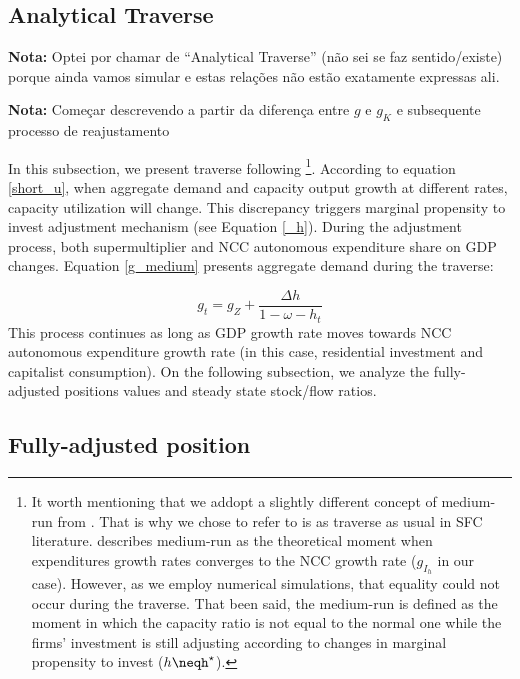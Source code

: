 \documentclass[11pt]{article}
\begin{document}
\subsection{Analytical Traverse}
\label{sec:org9442cc1}

\textbf{Nota:} Optei por chamar de ``Analytical Traverse'' (não sei se faz sentido/existe) porque ainda vamos simular e estas relações não estão exatamente expressas ali.

\textbf{Nota:} Começar descrevendo a partir da diferença entre \(g\) e \(g_K\) e subsequente processo de reajustamento

In this subsection, we present traverse following \textcite{freitas_growth_2015}\footnote{It worth mentioning that we addopt a slightly different concept of medium-run from \textcite{freitas_growth_2015}. That is why we chose to refer to is as traverse as usual in SFC literature. \textcite{freitas_growth_2015} describes medium-run as the theoretical moment when expenditures growth rates converges to the NCC growth rate (\(g_{I_h}\) in our case). However, as we employ numerical simulations, that equality could not occur during the traverse. That been said, the medium-run is defined as the moment in which the capacity ratio is not equal to the normal one while the firms' investment is still adjusting according to changes in marginal propensity to invest (\(h\neqh^\star\)).}.
According to equation \ref{short_u}, when aggregate demand and capacity output growth at different rates, capacity utilization will change. 
This discrepancy triggers marginal propensity to invest adjustment mechanism (see Equation \ref{_h}). 
During the adjustment process, both supermultiplier and NCC autonomous expenditure share on GDP changes.
Equation \ref{g_medium} presents aggregate demand during the traverse:

\begin{equation}
\label{g_medium}
g_t = g_{Z} + \frac{\Delta h}{1 - \omega - h_{t}}
\end{equation}
This process continues as long as GDP growth rate moves towards NCC autonomous expenditure growth rate (in this case, residential investment and capitalist consumption). On the following subsection, we analyze the fully-adjusted positions values and steady state stock/flow ratios.


\subsection{Fully-adjusted position}
\label{sec:org01d7210}
\label{long}
\end{document}
